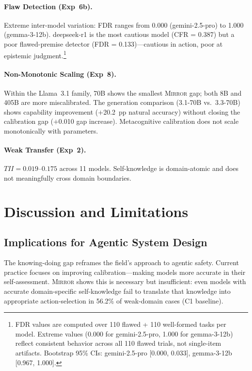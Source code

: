 \documentclass[10pt]{article}
\newcommand{\mirror}{\textsc{Mirror}}
\newcommand{\CFR}{CFR}
\newcommand{\FDR}{FDR}
\newcommand{\TII}{TII}
\begin{document}
\paragraph{Flaw Detection (Exp~6b).}
Extreme inter-model variation: \FDR{} ranges from 0.000 (gemini-2.5-pro) to 1.000 (gemma-3-12b). deepseek-r1 is the most cautious model (\CFR{} = 0.387) but a poor flawed-premise detector (\FDR{} = 0.133)---cautious in action, poor at epistemic judgment.\footnote{FDR values are computed over 110 flawed + 110 well-formed tasks per model. Extreme values (0.000 for gemini-2.5-pro, 1.000 for gemma-3-12b) reflect consistent behavior across all 110 flawed trials, not single-item artifacts. Bootstrap 95\% CIs: gemini-2.5-pro [0.000, 0.033], gemma-3-12b [0.967, 1.000].}

\paragraph{Non-Monotonic Scaling (Exp~8).}
Within the Llama~3.1 family, 70B shows the smallest \mirror{} gap; both 8B and
405B are more miscalibrated. The generation comparison (3.1-70B vs.\ 3.3-70B)
shows capability improvement ($+$20.2~pp natural accuracy) without closing the
calibration gap ($+$0.010 gap increase). Metacognitive calibration does not scale
monotonically with parameters.

\paragraph{Weak Transfer (Exp~2).}
$\TII{} = 0.019$--$0.175$ across 11 models. Self-knowledge is domain-atomic and does not meaningfully cross domain boundaries.

\section{Discussion and Limitations}
\label{sec:discussion}

\subsection{Implications for Agentic System Design}

The knowing-doing gap reframes the field's approach to agentic safety. Current
practice focuses on improving calibration---making models more accurate in their
self-assessment. \mirror{} shows this is necessary but insufficient: even models
with accurate domain-specific self-knowledge fail to translate that knowledge into
appropriate action-selection in 56.2\% of weak-domain cases (C1 baseline).
\end{document}
